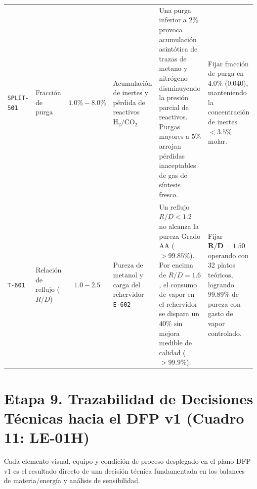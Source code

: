 \documentclass[10pt,letterpaper]{article}
\begin{document}
\begin{landscape}
\begin{xltabular}{\linewidth}{l >{\raggedright\arraybackslash}p{2.8cm} c >{\raggedright\arraybackslash}p{2.8cm} >{\raggedright\arraybackslash}X >{\raggedright\arraybackslash}p{4.8cm}}
\texttt{SPLIT-501} & Fracción de purga & $1.0\% - 8.0\%$ & Acumulación de inertes y pérdida de reactivos $\text{H}_2/\text{CO}_2$ & Una purga inferior a $2\%$ provoca acumulación asintótica de trazas de metano y nitrógeno disminuyendo la presión parcial de reactivos. Purgas mayores a $5\%$ arrojan pérdidas inaceptables de gas de síntesis fresco. & Fijar fracción de purga en $\mathbf{4.0\%}$ ($0.040$), manteniendo la concentración de inertes $<3.5\%$ molar. \\
\texttt{T-601} & Relación de reflujo ($R/D$) & $1.0 - 2.5$ & Pureza de metanol y carga del rehervidor \texttt{E-602} & Un reflujo $R/D < 1.2$ no alcanza la pureza Grado AA ($>99.85\%$). Por encima de $R/D = 1.6$, el consumo de vapor en el rehervidor se dispara un $40\%$ sin mejora medible de calidad ($>99.9\%$). & Fijar $\mathbf{R/D = 1.50}$ operando con 32 platos teóricos, logrando $99.89\%$ de pureza con gasto de vapor controlado. \\
\end{xltabular}
\end{landscape}

\newpage
\section{Etapa 9. Trazabilidad de Decisiones Técnicas hacia el DFP v1 (Cuadro 11: LE-01H)}

Cada elemento visual, equipo y condición de proceso desplegado en el plano DFP v1 es el resultado directo de una decisión técnica fundamentada en los balances de materia/energía y análisis de sensibilidad.
\end{document}

